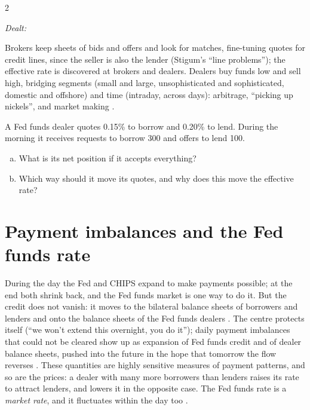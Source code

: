 \begin{paracol}{2}
\begin{taccts}
\medskip
\textit{Dealt:}\quad
{}\quad
{}\quad
{}
\end{taccts}
Brokers keep sheets of bids and offers and look for matches, fine-tuning quotes for credit lines, since the seller is also the lender (Stigum's ``line problems'');
the effective rate is discovered at brokers and dealers. Dealers buy funds low and sell high, bridging segments (small and large, unsophisticated and sophisticated,
domestic and offshore) and time (intraday, across days): arbitrage, ``picking up nickels'', and market making .

\begin{exercise}
A Fed funds dealer quotes 0.15\% to borrow and 0.20\% to lend. During the morning it receives requests to borrow 300 and offers to lend 100.
\begin{enumerate}[(a)]
  \item What is its net position if it accepts everything?
  \item Which way should it move its quotes, and why does this move the effective rate?
\end{enumerate}
\end{exercise}

\section{Payment imbalances and the Fed funds rate}\label{sec:ff-rate}

During the day the Fed and CHIPS expand to make payments possible; at the end both shrink back, and the Fed funds market is one way to do it. But the credit does
not vanish: it moves to the bilateral balance sheets of borrowers and lenders and onto the balance sheets of the Fed funds dealers .
The centre protects itself (``we won't extend this overnight, you do it''); daily payment imbalances that could not be cleared show up as expansion of Fed funds credit
and of dealer balance sheets, pushed into the future in the hope that tomorrow the flow reverses . These quantities are highly
sensitive measures of payment patterns, and so are the prices: a dealer with many more borrowers than lenders raises its rate to attract lenders, and lowers it in the
opposite case. The Fed funds rate is a \emph{market rate}, and it fluctuates within the day too .


\end{paracol}
